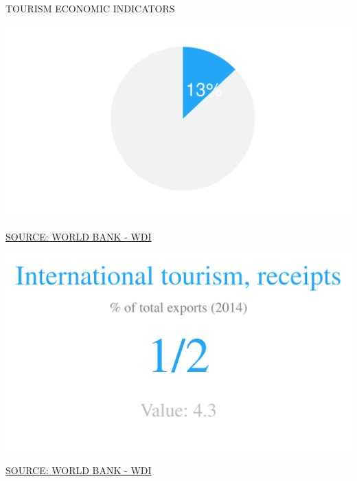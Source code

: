 \documentclass{article}\usepackage[]{graphicx}\usepackage[]{color}
\makeatletter
\def\maxwidth{ %
  \ifdim\Gin@nat@width>\linewidth
    \linewidth
  \else
    \Gin@nat@width
  \fi
}
\makeatother
\begin{document}
\begin{minipage}[c]{0.95\textwidth}
  \vspace{5ex}
  \begin{flushleft}  
    \hspace{4ex}\Large{\textcolor[HTML]{FF4023}{TOURISM ECONOMIC INDICATORS}}\hspace{2ex}\small{\textcolor[HTML]{818181} {}}
  \end{flushleft} 
  \begin{minipage}[c]{0.5\textwidth}
  \hspace{4ex}\small{\textcolor[HTML]{818181}{}}
    \vspace{1ex}


{\centering \includegraphics[width=\maxwidth]{figure/pie2_1-1} 

}



  \hspace{4ex}\scriptsize{\href{NA}{\textcolor[HTML]{FF4023}{SOURCE: WORLD BANK - WDI}}}
  \end{minipage}
  \begin{minipage}[c]{0.5\textwidth}
  \hspace{4ex}\small{\textcolor[HTML]{818181}{}}
    \vspace{1ex}


{\centering \includegraphics[width=\maxwidth]{figure/numberBig2_1-1} 

}



  \hspace{4ex}\scriptsize{\href{NA}{\textcolor[HTML]{FF4023}{SOURCE: WORLD BANK - WDI}}}
  \end{minipage}
\end{minipage}
\end{document}
